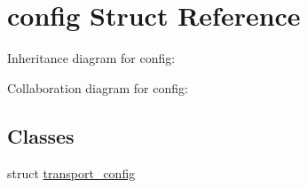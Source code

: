 \hypertarget{classconfig}{}\section{config Struct Reference}
\label{classconfig}


Inheritance diagram for config\+:


Collaboration diagram for config\+:
\subsection*{Classes}
\begin{DoxyCompactItemize}
\item 
struct \mbox{\hyperlink{structconfig_1_1transport__config}{transport\+\_\+config}}
\end{DoxyCompactItemize}

